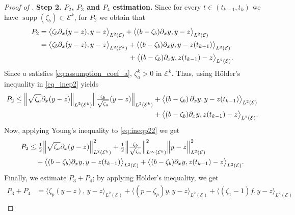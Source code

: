 \documentclass[a4paper, 10pt, english]{article}
\DeclareMathOperator{\supp}{supp}
\begin{document}
\begin{proof}[Proof of  ]
\noindent
{\bf Step 2. $P_2$, $P_3$ and $P_4$ estimation. } Since for every $t\in (t_{k-1},t_k)$ we have $\supp(\zeta_b)\subset \mathcal{E}^k $, for $P_2$ we obtain that
\begin{align}\label{eq_inep2}
P_2
&=
\bigl\langle
  \zeta_b\partial_x (y - z),
  y - z
\bigr\rangle_{L^2(\mathcal{E})}
+
\bigl\langle
  (b - \zeta_b)\partial_x y,
  y - z
\bigr\rangle_{L^2(\mathcal{E})}
\nonumber \\
&=
\bigl\langle
  \zeta_b\partial_x (y - z),
  y - z
\bigr\rangle_{L^2(\mathcal{E}^k)}
+
\bigl\langle
  (b - \zeta_b)\partial_x y,
  y - z(t_{k-1})
\bigr\rangle_{L^2(\mathcal{E})}
\nonumber \\
&\hspace{4.4cm}
+
\bigl\langle
  (b - \zeta_b)\partial_x y,
  z(t_{k-1}) - z
\bigr\rangle_{L^2(\mathcal{E})}.
\end{align}
Since $a$ satisfies \eqref{eq:assumption_coef_a}, $ \zeta_a^k>0$ in $\mathcal{E}^k$. Thus, using  Hölder’s inequality in \eqref{eq_inep2} yields
\begin{align}\label{eq:ineqp22}
\nonumber P_2
\leq
\Bigl\|\sqrt{\zeta_a}\partial_x (y - z)\Bigr\|_{L^2(\mathcal{E}^k)}
\Bigl\|\tfrac{\zeta_b}{\sqrt{\zeta_a}}(y - z)\Bigr\|_{L^2(\mathcal{E}^k)}
&+
\bigl\langle
  (b - \zeta_b)\,\partial_x y,
  y - z(t_{k-1})
\bigr\rangle_{L^2(\mathcal{E})}
 \\
&
+
\bigl\langle
  (b - \zeta_b)\partial_x y,
  z(t_{k-1}) - z
\bigr\rangle_{L^2(\mathcal{E})}.
\end{align}
Now, applying Young’s inequality to \eqref{eq:ineqp22} we get
\begin{align}\label{eq:last_P2}
P_2
&\le
\tfrac12
\Bigl\|\sqrt{\zeta_a}\partial_x (y - z)\Bigr\|_{L^2(\mathcal{E}^k)}^2
+
\tfrac12
\Bigl\|\tfrac{\zeta_b}{\sqrt{\zeta_a}}\Bigr\|_{L^\infty(\mathcal{E}^k)}^2
\Bigl\|y - z\Bigr\|_{L^2(\mathcal{E})}^2
\nonumber \\
&\quad
+
\bigl\langle
  (b - \zeta_b)\partial_x y,
  y - z(t_{k-1})
\bigr\rangle_{L^2(\mathcal{E})}
+
\bigl\langle
  (b - \zeta_b)\partial_x y,
  z(t_{k-1}) - z
\bigr\rangle_{L^2(\mathcal{E})}.
\end{align}
Finally, we estimate $P_3 + P_4$; by applying Hölder’s inequality, we get
\begin{align}\label{eq:last_P34}
P_3 + P_4
&=
\bigl\langle
  \zeta_p(y - z),
  \,y - z
\bigr\rangle_{L^2(\mathcal{E})}
+
\bigl\langle
  (p - \zeta_p)y,
  y - z
\bigr\rangle_{L^2(\mathcal{E})}
+
\bigl\langle
  (\zeta_1 - 1)f,
  y - z
\bigr\rangle_{L^2(\mathcal{E})}
\nonumber \\

\end{align}
\end{proof}
\end{document}
